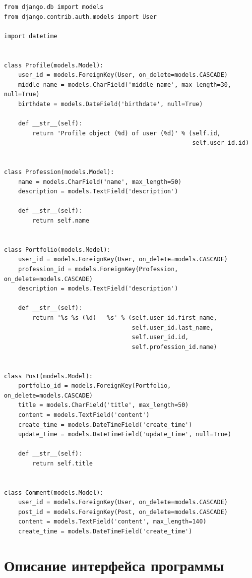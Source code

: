 \begin{lstlisting}[caption={Модели Django}, label=lst:models]
from django.db import models
from django.contrib.auth.models import User

import datetime


class Profile(models.Model):
    user_id = models.ForeignKey(User, on_delete=models.CASCADE)
    middle_name = models.CharField('middle_name', max_length=30, null=True)
    birthdate = models.DateField('birthdate', null=True)

    def __str__(self):
        return 'Profile object (%d) of user (%d)' % (self.id,
                                                     self.user_id.id)


class Profession(models.Model):
    name = models.CharField('name', max_length=50)
    description = models.TextField('description')

    def __str__(self):
        return self.name


class Portfolio(models.Model):
    user_id = models.ForeignKey(User, on_delete=models.CASCADE)
    profession_id = models.ForeignKey(Profession, on_delete=models.CASCADE)
    description = models.TextField('description')

    def __str__(self):
        return '%s %s (%d) - %s' % (self.user_id.first_name,
                                    self.user_id.last_name,
                                    self.user_id.id,
                                    self.profession_id.name)


class Post(models.Model):
    portfolio_id = models.ForeignKey(Portfolio, on_delete=models.CASCADE)
    title = models.CharField('title', max_length=50)
    content = models.TextField('content')
    create_time = models.DateTimeField('create_time')
    update_time = models.DateTimeField('update_time', null=True)

    def __str__(self):
        return self.title


class Comment(models.Model):
    user_id = models.ForeignKey(User, on_delete=models.CASCADE)
    post_id = models.ForeignKey(Post, on_delete=models.CASCADE)
    content = models.TextField('content', max_length=140)
    create_time = models.DateTimeField('create_time')
\end{lstlisting}

\section{Описание интерфейса программы}%
\label{sec:opisanie_interfeisa_programmy}


